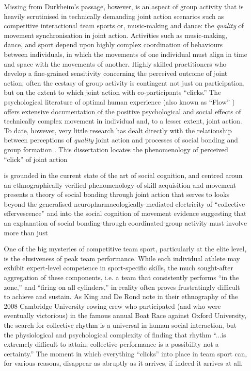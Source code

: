 Missing from Durkheim's passage, however, is an aspect of group activity that is heavily scrutinised in
technically demanding joint action scenarios such as competitive interactional team sports or, music-making and dance: the \textit{quality} of movement synchronisation in joint action.  Activities such as music-making, dance, and sport depend upon highly complex coordination of behaviours between individuals, in which the movements of one individual must align in time and space with the movements of another.  Highly skilled practitioners who develop a fine-grained sensitivity concerning the perceived outcome of joint action, often the ecstasy of group activity is contingent not just on participation, but on the extent to which joint action with co-participants ``clicks.''   The psychological literature of optimal human experience (also known as ``Flow'' \citep{Csikszentmihalyi1992}) offers extensive documentation of the positive psychological and social effects of technically complex movement in individual and, to a lesser extent, joint action. To date, however, very little research has dealt directly with the relationship between perceptions of \textit{quality} joint action and processes of social bonding and group formation \citep[but see][]{Marsh2009}.
This dissertation locates the phenomenology of perceived ``click'' of joint action

is grounded in the current state of the art of social cognition, and centred aroun
an ethnographically verified phenomenology of skill acquisition and movement
presents a theory of social bonding through joint action that serves to
 looks beyond the generalised neuropharmacologically-mediated electricity of  ``collective effervescence'' and into the social cognition of movement
evidence suggesting that an explanation of social bonding through coordinated group activity must involve more than just



One of the big mysteries of competitive team sport, particularly at the elite level, is the elusiveness of peak team performance.  While each individual athlete may exhibit expert-level competence in sport-specific skills, the much sought-after aggregation of these components, i.e. a team that consistently performs ``in the zone,'' and ``firing on all cylinders,'' in reality often proves frustratingly difficult to achieve and sustain.  As King and De Rond \textcite[568]{King2011} note in their ethnography of the 2008 Cambridge University rowing crew who participated (and who were eventually victorious) in the famous annual Boat Race against Oxford University, the search for collective rhythm is a universal in human social interaction, but  the physiological and psychological complexity of finding that rhythm ``...is extremely difficult to attain; collective performance is a possibility not a certainty.''   The moment in which everything ``clicks'' into place in team sport can, for various reasons, disappear as abruptly as it arrives, if indeed it arrives at all.

